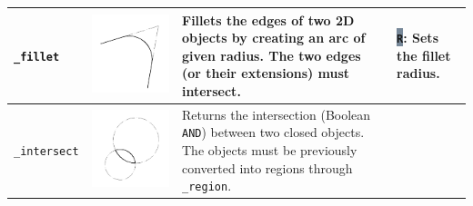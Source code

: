 \documentclass[..]{../IEEEphot}
\newcommand{\param}[1]{\colorbox{LightSlateGray}{\color{Navy}\texttt{\textbf{#1}}}}
\begin{document}
\begin{center}
\begin{longtable}{m{.2\linewidth}m{.2\linewidth}m{.25\linewidth}m{.25\linewidth}}
\\	
\midrule
\texttt{\_fillet} & \includegraphics[width = 0.8\linewidth, keepaspectratio]{../images/jpg/_fillet.jpg} & Fillets the edges of two 2D objects by creating an arc of given radius. The two edges (or their extensions) must intersect. & 
\param{R}: Sets the fillet radius.
\\
\midrule
\texttt{\_intersect} & \includegraphics[width = 0.8\linewidth, keepaspectratio]{../images/jpg/_intersect.jpg} & Returns the intersection (Boolean \texttt{AND}) between two closed objects. The objects must be previously converted into regions through \texttt{\_region}. & 

\end{longtable}
\end{center}
\end{document}
